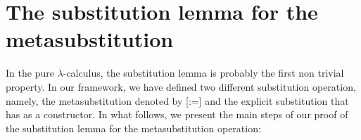 \begin{coqdoccode}
\coqdocemptyline
\end{coqdoccode}
\section{The substitution lemma for the metasubstitution}





   In the pure $\lambda$-calculus, the substitution lemma is probably the first non trivial property. In our framework, we have defined two different substitution operation, namely, the metasubstitution denoted by [:=] and the explicit substitution that has  as a constructor. In what follows, we present the main steps of our proof of the substitution lemma for the metasubstitution operation: 
 
